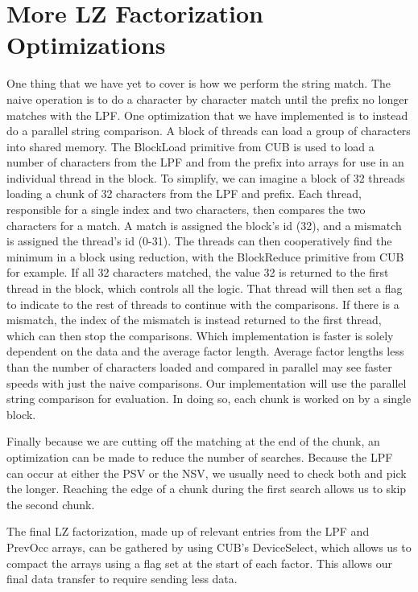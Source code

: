 \section{More LZ Factorization Optimizations}

One thing that we have yet to cover is how we perform the string match.
The naive operation is to do a character by character match until the prefix no longer matches with the LPF.
One optimization that we have implemented is to instead do a parallel string comparison.
A block of threads can load a group of characters into shared memory.
The BlockLoad primitive from CUB is used to load a number of characters from the LPF and from the prefix into arrays for use in an individual thread in the block.
To simplify, we can imagine a block of 32 threads loading a chunk of 32 characters from the LPF and prefix.
Each thread, responsible for a single index and two characters, then compares the two characters for a match.
A match is assigned the block's id (32), and a mismatch is assigned the thread's id (0-31).
The threads can then cooperatively find the minimum in a block using reduction, with the BlockReduce primitive from CUB for example.
If all 32 characters matched, the value 32 is returned to the first thread in the block, which controls all the logic.
That thread will then set a flag to indicate to the rest of threads to continue with the comparisons.
If there is a mismatch, the index of the mismatch is instead returned to the first thread, which can then stop the comparisons.
Which implementation is faster is solely dependent on the data and the average factor length.
Average factor lengths less than the number of characters loaded and compared in parallel may see faster speeds with just the naive comparisons.
Our implementation will use the parallel string comparison for evaluation.
In doing so, each chunk is worked on by a single block.

Finally because we are cutting off the matching at the end of the chunk, an optimization can be made to reduce the number of searches.
Because the LPF can occur at either the PSV or the NSV, we usually need to check both and pick the longer. 
Reaching the edge of a chunk during the first search allows us to skip the second chunk.

The final LZ factorization, made up of relevant entries from the LPF and PrevOcc arrays, can be gathered by using CUB's DeviceSelect, which allows us to compact the arrays using a flag set at the start of each factor.
This allows our final data transfer to require sending less data.
